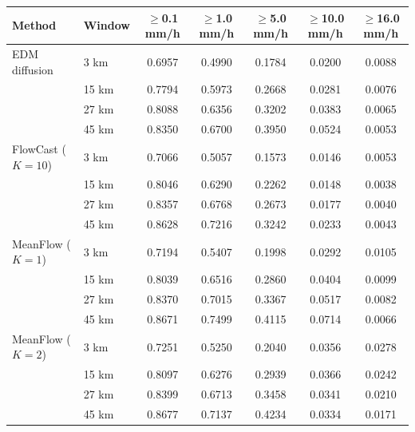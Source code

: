 \documentclass[border=10pt]{standalone}
\begin{document}
\begin{tabular}{llccccc}
\toprule
Method & Window & $\geq$0.1 mm/h & $\geq$1.0 mm/h & $\geq$5.0 mm/h & $\geq$10.0 mm/h & $\geq$16.0 mm/h \\
\midrule
EDM diffusion & 3 km & 0.6957 & 0.4990 & 0.1784 & 0.0200 & 0.0088 \\
 & 15 km & 0.7794 & 0.5973 & 0.2668 & 0.0281 & 0.0076 \\
 & 27 km & 0.8088 & 0.6356 & 0.3202 & 0.0383 & 0.0065 \\
 & 45 km & 0.8350 & 0.6700 & 0.3950 & 0.0524 & 0.0053 \\
FlowCast ($K{=}10$) & 3 km & 0.7066 & 0.5057 & 0.1573 & 0.0146 & 0.0053 \\
 & 15 km & 0.8046 & 0.6290 & 0.2262 & 0.0148 & 0.0038 \\
 & 27 km & 0.8357 & 0.6768 & 0.2673 & 0.0177 & 0.0040 \\
 & 45 km & 0.8628 & 0.7216 & 0.3242 & 0.0233 & 0.0043 \\
MeanFlow ($K{=}1$) & 3 km & 0.7194 & 0.5407 & 0.1998 & 0.0292 & 0.0105 \\
 & 15 km & 0.8039 & 0.6516 & 0.2860 & 0.0404 & 0.0099 \\
 & 27 km & 0.8370 & 0.7015 & 0.3367 & 0.0517 & 0.0082 \\
 & 45 km & 0.8671 & 0.7499 & 0.4115 & 0.0714 & 0.0066 \\
MeanFlow ($K{=}2$) & 3 km & 0.7251 & 0.5250 & 0.2040 & 0.0356 & 0.0278 \\
 & 15 km & 0.8097 & 0.6276 & 0.2939 & 0.0366 & 0.0242 \\
 & 27 km & 0.8399 & 0.6713 & 0.3458 & 0.0341 & 0.0210 \\
 & 45 km & 0.8677 & 0.7137 & 0.4234 & 0.0334 & 0.0171 \\
\bottomrule
\end{tabular}
\end{document}
